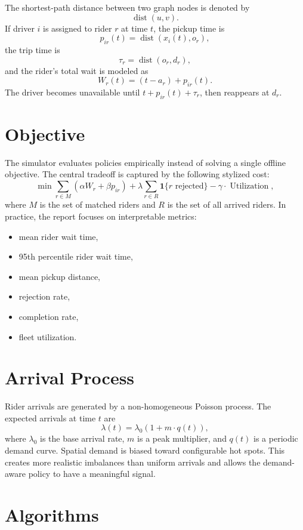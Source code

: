 \documentclass[11pt]{article}
\begin{document}
The shortest-path distance between two graph nodes is denoted by
\[
\operatorname{dist}(u,v).
\]
If driver \(i\) is assigned to rider \(r\) at time \(t\), the pickup time is
\[
p_{ir}(t) = \operatorname{dist}(x_i(t), o_r),
\]
the trip time is
\[
\tau_r = \operatorname{dist}(o_r, d_r),
\]
and the rider's total wait is modeled as
\[
W_r(t) = (t - a_r) + p_{ir}(t).
\]
The driver becomes unavailable until \(t + p_{ir}(t) + \tau_r\), then reappears at \(d_r\).

\section{Objective}

The simulator evaluates policies empirically instead of solving a single offline objective. The central tradeoff is captured by the following stylized cost:
\[
\min \sum_{r \in M} \left(\alpha W_r + \beta p_{ir}\right)
  + \lambda \sum_{r \in R} \mathbf{1}\{r \text{ rejected}\}
  - \gamma \cdot \operatorname{Utilization},
\]
where \(M\) is the set of matched riders and \(R\) is the set of all arrived riders. In practice, the report focuses on interpretable metrics:

\begin{itemize}[nosep]
  \item mean rider wait time,
  \item 95th percentile rider wait time,
  \item mean pickup distance,
  \item rejection rate,
  \item completion rate,
  \item fleet utilization.
\end{itemize}

\section{Arrival Process}

Rider arrivals are generated by a non-homogeneous Poisson process. The expected arrivals at time \(t\) are
\[
\lambda(t) = \lambda_0 \left(1 + m \cdot q(t)\right),
\]
where \(\lambda_0\) is the base arrival rate, \(m\) is a peak multiplier, and \(q(t)\) is a periodic demand curve. Spatial demand is biased toward configurable hot spots. This creates more realistic imbalances than uniform arrivals and allows the demand-aware policy to have a meaningful signal.

\section{Algorithms}
\end{document}
